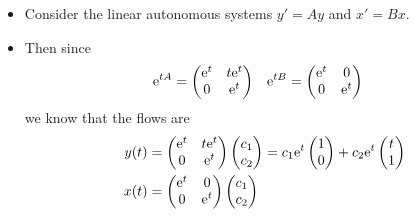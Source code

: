 \documentclass[../notes.tex]{subfiles}
\begin{document}
\begin{itemize}
\begin{itemize}
        \item Consider the linear autonomous systems $y'=Ay$ and $x'=Bx$.
        \item Then since
        \begin{align*}
            \e[tA] &=
            \begin{pmatrix}
                \e[t] & t\e[t]\\
                0 & \e[t]\\
            \end{pmatrix}&
            \e[tB] &=
            \begin{pmatrix}
                \e[t] & 0\\
                0 & \e[t]\\
            \end{pmatrix}
        \end{align*}
        we know that the flows are
        \begin{align*}
            y(t) &=
            \begin{pmatrix}
                \e[t] & t\e[t]\\
                0 & \e[t]\\
            \end{pmatrix}
            \begin{pmatrix}
                c_1\\
                c_2\\
            \end{pmatrix}
                = c_1\e[t]
                \begin{pmatrix}
                    1\\
                    0\\
                \end{pmatrix}
                +c_2\e[t]
                \begin{pmatrix}
                    t\\
                    1\\
                \end{pmatrix}\\
            x(t) &=
            \begin{pmatrix}
                \e[t] & 0\\
                0 & \e[t]\\
            \end{pmatrix}
            \begin{pmatrix}
                c_1\\
                c_2\\

\end{pmatrix}
\end{align*}
\end{itemize}
\end{itemize}
\end{document}
